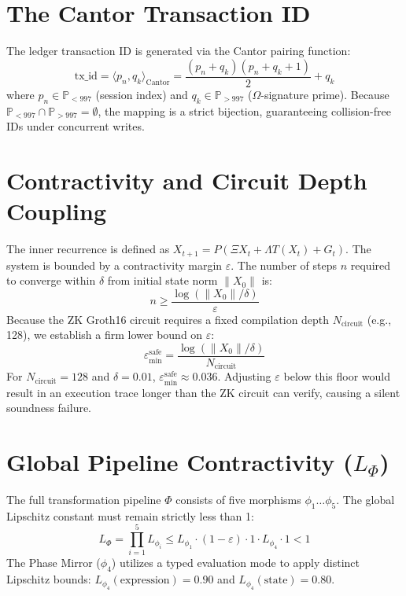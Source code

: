 \documentclass[11pt]{article}
\begin{document}
\section{The Cantor Transaction ID}
The ledger transaction ID is generated via the Cantor pairing function:
\begin{equation}
\text{tx\_id} = \langle p_n, q_k \rangle_{\text{Cantor}} = \frac{(p_n + q_k)(p_n + q_k + 1)}{2} + q_k
\end{equation}
where \(p_n \in \mathbb{P}_{< 997}\) (session index) and \(q_k \in \mathbb{P}_{> 997}\) (\(\Omega\)-signature prime). Because \(\mathbb{P}_{< 997} \cap \mathbb{P}_{> 997} = \emptyset\), the mapping is a strict bijection, guaranteeing collision-free IDs under concurrent writes.

\section{Contractivity and Circuit Depth Coupling}
The inner recurrence is defined as \(X_{t+1} = P(\Xi X_t + \Lambda T(X_t) + G_t)\). The system is bounded by a contractivity margin \(\varepsilon\).
The number of steps \(n\) required to converge within \(\delta\) from initial state norm \(\|X_0\|\) is:
\begin{equation}
n \geq \frac{\log(\|X_0\|/\delta)}{\varepsilon}
\end{equation}
Because the ZK Groth16 circuit requires a fixed compilation depth \(N_{\text{circuit}}\) (e.g., 128), we establish a firm lower bound on \(\varepsilon\):
\begin{equation}
\varepsilon_{\min}^{\text{safe}} = \frac{\log(\|X_0\|/\delta)}{N_{\text{circuit}}}
\end{equation}
For \(N_{\text{circuit}} = 128\) and \(\delta = 0.01\), \(\varepsilon_{\min}^{\text{safe}} \approx 0.036\). Adjusting \(\varepsilon\) below this floor would result in an execution trace longer than the ZK circuit can verify, causing a silent soundness failure.

\section{Global Pipeline Contractivity (\(L_\Phi\))}
The full transformation pipeline \(\Phi\) consists of five morphisms \(\phi_1 \dots \phi_5\). The global Lipschitz constant must remain strictly less than 1:
\begin{equation}
L_\Phi = \prod_{i=1}^{5} L_{\phi_i} \leq L_{\phi_1} \cdot (1 - \varepsilon) \cdot 1 \cdot L_{\phi_4} \cdot 1 < 1
\end{equation}
The Phase Mirror (\(\phi_4\)) utilizes a typed evaluation mode to apply distinct Lipschitz bounds: \(L_{\phi_4}(\text{expression}) = 0.90\) and \(L_{\phi_4}(\text{state}) = 0.80\). 
\end{document}
